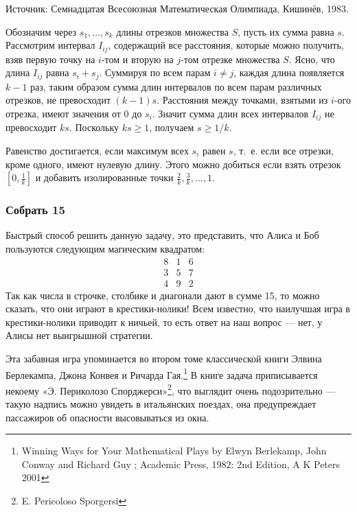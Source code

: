 {\small Источник: Семнадцатая Всесоюзная Математическая Олимпиада, Кишинёв, 1983.}

Обозначим через $s_1,\dots,s_k$ длины отрезков множества $S$,
пусть их сумма равна $s$.
Рассмотрим интервал $I_{ij}$, содержащий все расстояния, которые можно получить, взяв первую точку на $i$-том и вторую на $j$-том отрезке множества $S$.
Ясно, что длина $I_{ij}$ равна $s_i+s_j$.
Суммируя по всем парам $i\ne j$, 
каждая длина появляется $k-1$ раз,
таким образом сумма длин интервалов по всем парам различных отрезков, не превосходит $(k-1) s$.
Расстояния между точками, взятыми из $i$-ого отрезка, имеют значения от $0$ до $s_i$.
Значит сумма длин всех интервалов $I_{ij}$ не превосходит $k s$.
Поскольку $k s\ge 1$, получаем $s\ge 1/k$.
\heart

Равенство достигается, если максимум всех $s_i$ равен $s$, 
т.~е. если все отрезки, кроме одного, имеют нулевую длину.
Этого можно добиться если взять отрезок $[0,\tfrac1k]$ и добавить изолированные точки
$\tfrac2k,\tfrac3k,\dots,1$.


\subsubsection*{Собрать 15} %

Быстрый способ решить данную задачу, это представить, что Алиса и Боб пользуются следующим магическим квадратом:
$$
\begin{matrix}
8&1&6\\
3&5&7\\
4&9&2
\end{matrix}
$$
Так как числа в строчке, столбике и диагонали дают в сумме 15, то можно сказать, что они играют в крестики-нолики! 
Всем известно, что наилучшая игра в крестики-нолики приводит к ничьей,
то есть ответ на наш вопрос --- нет, у Алисы нет выигрышной стратегии.
\heart

Эта забавная игра упоминается во втором томе классической книги Элвина Берлекампа, Джона Конвея и Ричарда Гая.\footnote{Winning Ways for Your Mathematical Plays by Elwyn Berlekamp, John Conway and Richard Guy ; Academic Press, 1982: 2nd Edition, A K Peters 2001}
В книге задача приписывается некоему «Э. Периколозо Спорджерси»\footnote{E. Pericoloso Sporgersi}, что выглядит очень подозрительно --- такую надпись можно увидеть в итальянских поездах, она предупреждает пассажиров об опасности высовываться из окна.
